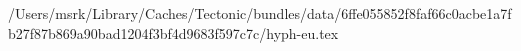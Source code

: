 /Users/msrk/Library/Caches/Tectonic/bundles/data/6ffe055852f8faf66c0acbe1a7fb27f87b869a90bad1204f3bf4d9683f597c7c/hyph-eu.tex